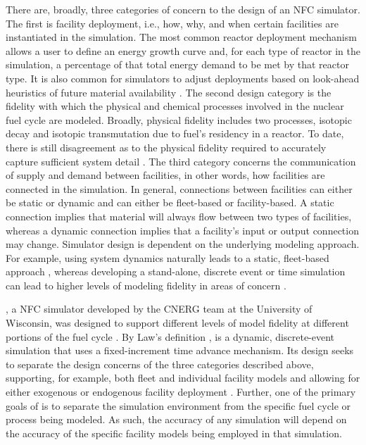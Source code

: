 There are, broadly, three categories of concern to the design of an NFC
simulator. The first is facility deployment, i.e., how, why, and when certain
facilities are instantiated in the simulation. The most common reactor
deployment mechanism allows a user to define an energy growth curve and, for
each type of reactor in the simulation, a percentage of that total energy demand
to be met by that reactor type. It is also common for simulators to adjust
deployments based on look-ahead heuristics of future material availability
\cite{schweitzer_improved_2008, van_den_durpel_daness_2009}. The second design
category is the fidelity with which the physical and chemical processes involved
in the nuclear fuel cycle are modeled. Broadly, physical fidelity includes two
processes, isotopic decay and isotopic transmutation due to fuel's residency in
a reactor. To date, there is still disagreement as to the physical fidelity
required to accurately capture sufficient system detail \cite{guerin_impact_2009}. The
third category concerns the communication of supply and demand between
facilities, in other words, how facilities are connected in the simulation. In
general, connections between facilities can either be static or dynamic and can
either be fleet-based or facility-based. A static connection implies that
material will always flow between two types of facilities, whereas a dynamic
connection implies that a facility's input or output connection may
change. Simulator design is dependent on the underlying modeling approach. For
example, using system dynamics \cite{forrester1971counterintuitive} naturally
leads to a static, fleet-based approach \cite{busquim_e_silva_system_2008,
  durpel_daness_2003, yacout_vision_2006}, whereas developing a stand-alone,
discrete event or time simulation \cite{Law:1999:SMA:554952} can lead to higher
levels of modeling fidelity in areas of concern \cite{schneider_nfcsim:_2005,
  mouginot2012class, boucher_cosi:_2006}.

\Cyclus, a NFC simulator developed by the CNERG team at the University of
Wisconsin, was designed to support different levels of model fidelity at
different portions of the fuel cycle \cite{huff_cyclus_2015}. By Law's
definition \cite{Law:1999:SMA:554952}, \Cyclus is a dynamic, discrete-event
simulation that uses a fixed-increment time advance mechanism. Its design seeks
to separate the design concerns of the three categories described above,
supporting, for example, both fleet and individual facility models and allowing
for either exogenous or endogenous facility deployment
\cite{carlsen_fleet_2016}. Further, one of the primary goals of \Cyclus is to 
separate the simulation environment from the specific fuel cycle or process 
being modeled.  As such, the accuracy of any simulation will depend on the
accuracy of the specific facility models being employed in that simulation.

